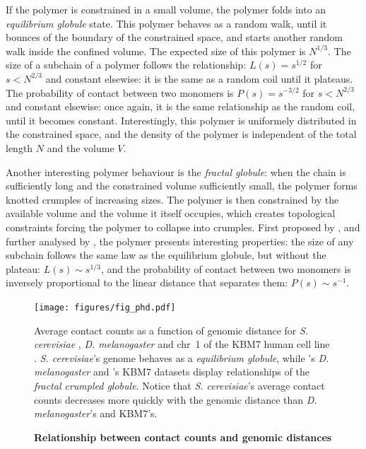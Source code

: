 If the polymer is constrained in a small volume, the polymer folds into an
\textit{equilibrium globule} state. This polymer behaves as a random walk,
until it bounces of the boundary of the constrained space, and starts another
random walk inside the confined volume. The expected size of this polymer is
$N^{1/3}$. The size of a subchain of a polymer follows the relationship: $L(s) =
s^{1/2}$ for $s < N^{2/3}$ and constant elsewise: it is the same as a random
coil until it plateaus. The probability of contact between two monomers is
$P(s) = s^{-3/2}$ for $s < N^{2/3}$ and constant elsewise: once again, it is
the same relationship as the random coil, until it becomes constant.
Interestingly, this polymer is uniformely distributed in the constrained
space, and the density of the polymer is independent of the total length $N$
and the volume $V$.

Another interesting polymer behaviour is the \textit{fractal globule}: when
the chain is sufficiently long and the constrained volume sufficiently small,
the polymer forms knotted crumples of increasing sizes. The polymer is then
constrained by the available volume and the volume it itself occupies, which
creates topological constraints forcing the polymer to collapse into crumples.
First proposed by \citet{grosberg:role}, and further analysed by
\citet{mirny:fractal}, the polymer presents interesting properties: the size
of any subchain follows the same law as the equilibrium globule, but without
the plateau: $L(s) \sim s^{1/3}$, and the probability of contact between two
monomers is inversely proportional to the linear distance that separates them:
$P(s) \sim s^{-1}$.


\begin{figure}
\begin{center}
\texttt{[image: figures/fig\_phd.pdf]}
\end{center}
\caption{{\bf Relationship between contact counts and genomic distances}}{
Average contact counts as a function of genomic distance for \textit{S.
cerevisiae} \citep{duan:three},
\textit{D. melanogaster} \citep{sexton:three-dimensional} and chr~1 of the
KBM7 human cell line \citep{rao:3d}. \textit{S. cerevisiae}'s genome behaves
as a \textit{equilibrium globule},
while \citet{sexton:three-dimensional}'s \textit{D.
melanogaster} and \citet{rao:3d}'s KBM7 datasets display relationships of the
\textit{fractal crumpled globule}. Notice that \textit{S. cerevisiae}'s
average contact counts decreases more quickly with the genomic distance than
\textit{D. melanogaster}'s and KBM7's.
}
\label{fig:hic_relationships}
\end{figure}

